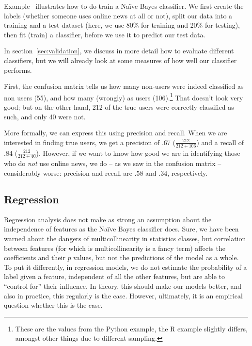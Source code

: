 
Example~ illustrates how to do train a Na\"ive Bayes classifier.
We first create the labels (whether someone uses online news at all or not), split our data into a training and a test dataset (here, we use 80\% for training and 20\% for testing), then fit (train) a classifier, before we use it to predict our test data.

In section~\ref{sec:validation}, we discuss in more detail how to evaluate different classifiers, but we will already look at some measures of how well our classifier performs.

First, the confusion matrix tells us how many non-users were indeed classified as non users (55), and how many (wrongly) as users (106).\footnote{These are the values from the Python example, the R example slightly differs, amongst other things due to different sampling.} That doesn't look very good; but on the other hand, 212 of the true users were correctly classified as such, and only 40 were not.

More formally, we can express this using precision and recall. When we are interested in finding true users, we get a precision of .67 ($\frac{212}{212+106}$) and a recall of .84 ($\frac{212}{212+40}$).
However, if we want to know how good we are in identifying those who do \emph{not} use online news, we do -- as we saw in the confusion matrix -- considerably worse: precision and recall are .58 and .34, respectively. 



\subsection{Regression}
Regression analysis does not make as strong an assumption about the independence of features as the Na\"ive Bayes classifier does.
Sure, we have been warned about the dangers of multicollinearity in statistics classes,
but correlation between features (for which is multicollinearity is a fancy term)
affects the coefficients and their $p$ values, but not the predictions of the model
as a whole.
To put it differently, in regression models, we do not estimate the probability of a label given a feature, independent of all the other features, but are able to ``control for'' their influence.
In theory, this should make our models better, and also in practice, this regularly is
the case. However, ultimately, it is an empirical question whether this is the case.

